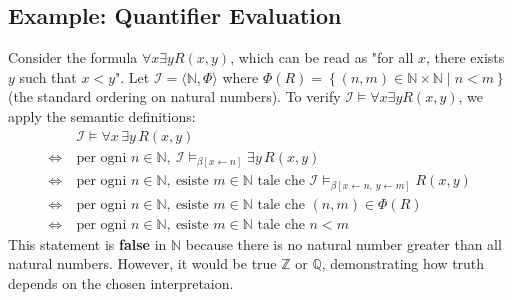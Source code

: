 \documentclass[a4paper]{article}
\theoremstyle{definition}
\begin{document}
\subsection{Example: Quantifier Evaluation}
Consider the formula \( \forall x \exists y R(x,y) \), which can be read as "for all \( x \), there exists \( y \) such that 
\( x < y \)".
\vspace{1em}
\noindent
\newline
Let \( \mathcal{I} = \langle \mathbb{N}, \Phi \rangle \) where \( \Phi(R) = \left\{ (n,m) \in \mathbb{N} \times \mathbb{N} \;|\; n < m \right\} \) (the 
standard ordering on natural numbers).
\vspace{1em}
\noindent
\newline
To verify \( \mathcal{I} \models \forall x \exists y R(x,y) \), we apply the semantic definitions:
\begin{align*}
	& \mathcal{I} \models \forall x\, \exists y\, R(x,y) \\
	\iff\ & \text{per ogni } n \in \mathbb{N},\
		\mathcal{I} \models_{\beta[x \leftarrow n]} \exists y\, R(x,y) \\
	\iff\ & \text{per ogni } n \in \mathbb{N},\ \text{esiste } m \in \mathbb{N} \text{ tale che }
		\mathcal{I} \models_{\beta[x \leftarrow n,\, y \leftarrow m]} R(x,y) \\
	\iff\ & \text{per ogni } n \in \mathbb{N},\ \text{esiste } m \in \mathbb{N} \text{ tale che }
		(n,m) \in \Phi(R) \\
	\iff\ & \text{per ogni } n \in \mathbb{N},\ \text{esiste } m \in \mathbb{N} \text{ tale che }
		n < m
\end{align*}
This statement is \textbf{false} in \( \mathbb{N} \) because there is no natural number greater than all natural numbers.
However, it would be true \( \mathbb{Z} \) or \( \mathbb{Q} \), demonstrating how truth depends on the chosen interpretaion.
\end{document}
